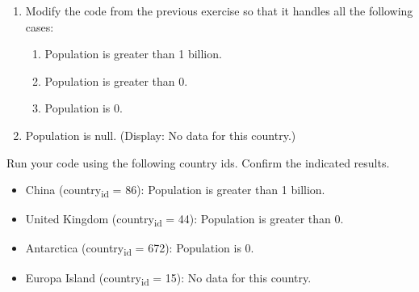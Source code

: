 \documentclass[11pt]{article}
\begin{document}
\begin{enumerate}
\item Modify the code from the previous exercise so that it handles all the following cases:

\begin{enumerate}
\item Population is greater than 1 billion.

\item Population is greater than 0.

\item Population is 0.
\end{enumerate}

\item Population is null. (Display: No data for this country.)
\end{enumerate}

Run your code using the following country ids. Confirm the indicated results.

\begin{itemize}
\item China (country\textsubscript{id} = 86): Population is greater than 1 billion.

\item United Kingdom (country\textsubscript{id} = 44): Population is greater than 0.

\item Antarctica (country\textsubscript{id} = 672): Population is 0.

\item Europa Island (country\textsubscript{id} = 15): No data for this country.
\end{itemize}
\end{document}
